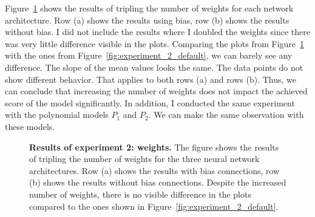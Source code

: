 Figure~\ref{fig:experiment_2_weights} shows the results of tripling the number of weights for each network architecture. Row (a) shows the results using bias, row (b) shows the results without bias. I did not include the results where I doubled the weights since there was very little difference visible in the plots. Comparing the plots from Figure~\ref{fig:experiment_2_weights} with the ones from Figure~\ref{fig:experiment_2_default}, we can barely see any difference. The slope of the mean values looks the same. The data points do not show different behavior. That applies to both rows (a) and rows (b). Thus, we can conclude that increasing the number of weights does not impact the achieved score of the model significantly. In addition, I conducted the same experiment with the polynomial models $P_1$ and $P_2$. We can make the same observation with these models.
\begin{figure}[!ht]
\begin{figrow}
\item \label{row:NN_with_bias_wfactor_3} 
\item \label{row:NN_without_bias_wfactor_3}  
\end{figrow}
\vspace*{-5mm}
\caption[Results of experiment 2: weights]{
  \textbf{Results of experiment 2: weights.}
   The figure shows the results of tripling the number of weights for the three neural network architectures. Row (a) shows the results with bias connections, row (b) shows the results without bias connections. Despite the increased number of weights, there is no visible difference in the plots compared to the ones shown in Figure~\ref{fig:experiment_2_default}.
}
\label{fig:experiment_2_weights}
\end{figure}


